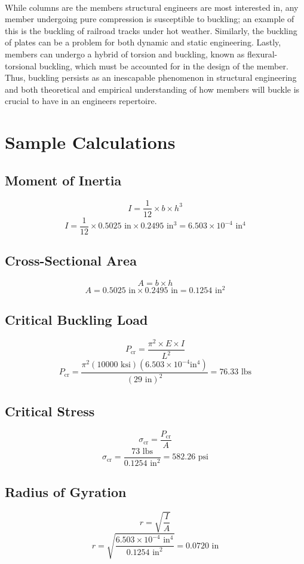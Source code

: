 \documentclass{article}
\begin{document}
    \\
    While columns are the members structural engineers are most interested in, any member undergoing pure compression is susceptible to buckling; an example of this is the buckling of railroad tracks under hot weather. Similarly, the buckling of plates can be a problem for both dynamic and static engineering. Lastly, members can undergo a hybrid of torsion and buckling, known as flexural-torsional buckling, which must be accounted for in the design of the member. Thus, buckling persists as an inescapable phenomenon in structural engineering and both theoretical and empirical understanding of how members will buckle is crucial to have in an engineers repertoire. 
    
    \newpage
    {\singlespacing\section{Sample Calculations}
    \subsection{Moment of Inertia}
    \[I = \frac{1}{12}\times b\times h^3\]
    \[I = \frac{1}{12}\times 0.5025\text{ in}\times 0.2495\text{ in}^3 = \boxed{6.503\times 10^{-4} \text{ in}^4}\] 
    \subsection{Cross-Sectional Area}
    \[A=b\times h\]
    \[A=0.5025\text{ in}\times 0.2495\text{ in}=\boxed{0.1254\text{ in}^2}\]
    \subsection{Critical Buckling Load}
    \[P_\text{cr} = \frac{\pi^2\times E\times I}{L^2}\]
    \[P_\text{cr} = \frac{\pi^2(10000\text{ ksi})(6.503\times 10^{-4}\text{in}^4)}{(29 \text{ in})^2} = \boxed{76.33 \text{ lbs}}\]
    \subsection{Critical Stress}
    \[\sigma_\text{cr} = \frac{P_\text{cr}}{A}\]
    \[\sigma_\text{cr} = \frac{73\text{ lbs}}{0.1254\text{ in}^2}= \boxed{582.26\text{ psi}}\]
    \subsection{Radius of Gyration}
    \[r=\sqrt{\frac{I}{A}}\]
    \[r=\sqrt{\frac{6.503\times 10^{-4}\text{ in}^4}{0.1254\text{ in}^2}}=\boxed{0.0720\text{ in}}\]
}
\end{document}

